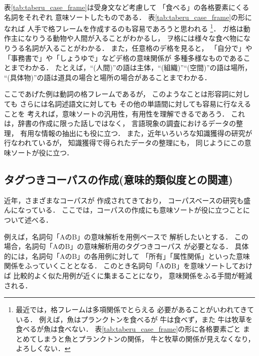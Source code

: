表\ref{tab:taberu_case_frame}は受身文など考慮して
「食べる」の各格要素にくる名詞をそれぞれ
意味ソートしたものである．
表\ref{tab:taberu_case_frame}の形になれば
人手で格フレームを作成するのも容易であろうと思われる
\footnote{
最近では，格フレームは多項関係でとらえる
必要があることがいわれてきている．
例えば，魚はプランクトンを食べるが
牛は食べず，また
牛は牧草を食べるが魚は食べない．
表\ref{tab:taberu_case_frame}の形に各格要素ごと
まとめてしまうと魚とプランクトンの関係，
牛と牧草の関係が見えなくなり，よろしくない．}．
ガ格は動作主になりうる動物や人間が入ることがわかるし，
ヲ格には様々な食べ物になりうる名詞が入ることがわかる．
また，任意格のデ格を見ると，
「自分で」や「事務書で」や「しょうゆで」などデ格の意味関係が
多種多様なものであることまでわかる．
たとえば，``(人間)''の語は主体，``(組織)''``(空間)''の語は場所，
``(具体物)''の語は道具の場合と場所の場合があることまでわかる．

ここであげた例は動詞の格フレームであるが，
このようなことは形容詞に対しても
さらには名詞述語文に対しても
その他の単語間に対しても容易に行なえることを
考えれば，意味ソートの汎用性，有用性を理解できるであろう．
これは，辞書の作成に限った話しではなく，
言語現象の調査におけるデータの整理，
有用な情報の抽出にも役に立つ．
また，近年いろいろな知識獲得の研究が行なわれているが，
知識獲得で得られたデータの整理にも，
同じようにこの意味ソートが役に立つ．

\subsection{タグつきコーパスの作成(意味的類似度との関連)}

近年，さまざまなコーパスが
作成されてきており\cite{edr_corpus_2.1}\cite{kurohashi_nlp97}\cite{rwc}，
コーパスベースの研究も盛んになっている\cite{mori_DT}\cite{murata:nlken98}．
ここでは，コーパスの作成にも意味ソートが役に立つことに
ついて述べる．

例えば，名詞句「AのB」の意味解析を用例ベースで
解析したいとする．
この場合，名詞句「AのB」の意味解析用のタグつきコーパス
が必要となる．
具体的には，名詞句「AのB」の各用例に対して
「所有」「属性関係」といった意味関係をふっていくこととなる．
このとき名詞句「AのB」を意味ソートしておけば
比較的よく似た用例が近くに集まることになり，
意味関係をふる手間が軽減される．


